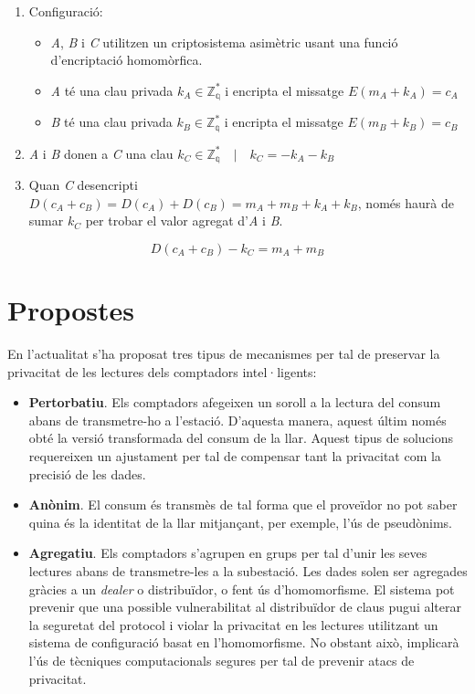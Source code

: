 \documentclass{article}
\begin{document}
\begin{enumerate}
	\item Configuració:
	\begin{itemize}
		\item \textit{A}, \textit{B} i \textit{C} utilitzen un criptosistema asimètric usant una funció d'encriptació homomòrfica.
		\item \textit{A} té una clau privada $k_A \in \mathbb{Z_q^*}$ i encripta el missatge $E(m_A + k_A) = c_A$
		\item \textit{B} té una clau privada $k_B \in \mathbb{Z_q^*}$  i encripta el missatge $E(m_B + k_B) = c_B$
	\end{itemize}
	\item \textit{A} i \textit{B} donen a \textit{C} una clau $k_C \in \mathbb{Z_q^*} \quad | \quad k_C = - k_A - k_B$
	\item Quan \textit{C} desencripti $D(c_A + c_B) = D(c_A) + D(c_B) = m_A + m_B + k_A + k_B$, només haurà de sumar $k_C$ per trobar el valor agregat d'\textit{A} i \textit{B}.
\end{enumerate}
\[D(c_A + c_B) - k_C = m_A + m_B\]
\newpage\part{Propostes}\label{part:propostes}
En l'actualitat s'ha proposat tres tipus de mecanismes per tal de preservar la privacitat de les lectures dels comptadors intel·ligents:
\begin{itemize}
	\item \textbf{Pertorbatiu}. Els comptadors afegeixen un soroll a la lectura del consum abans de transmetre-ho a l'estació. D'aquesta manera, aquest últim només obté la versió transformada del consum de la llar. Aquest tipus de solucions requereixen un ajustament per tal de compensar tant la privacitat com la precisió de les dades.
	\item \textbf{Anònim}. El consum és transmès de tal forma que el proveïdor no pot saber quina és la identitat de la llar mitjançant, per exemple, l'ús de pseudònims.
	\item \textbf{Agregatiu}. Els comptadors s'agrupen en grups per tal d'unir les seves lectures abans de transmetre-les a la subestació. Les dades solen ser agregades gràcies a un \textit{dealer} o distribuïdor, o fent ús d'homomorfisme. El sistema pot prevenir que una possible vulnerabilitat al distribuïdor de claus pugui alterar la seguretat del protocol i violar la privacitat en les lectures utilitzant un sistema de configuració basat en l'homomorfisme. No obstant això, implicarà l'ús de tècniques computacionals segures per tal de prevenir atacs de privacitat.
\end{itemize}
\end{document}

